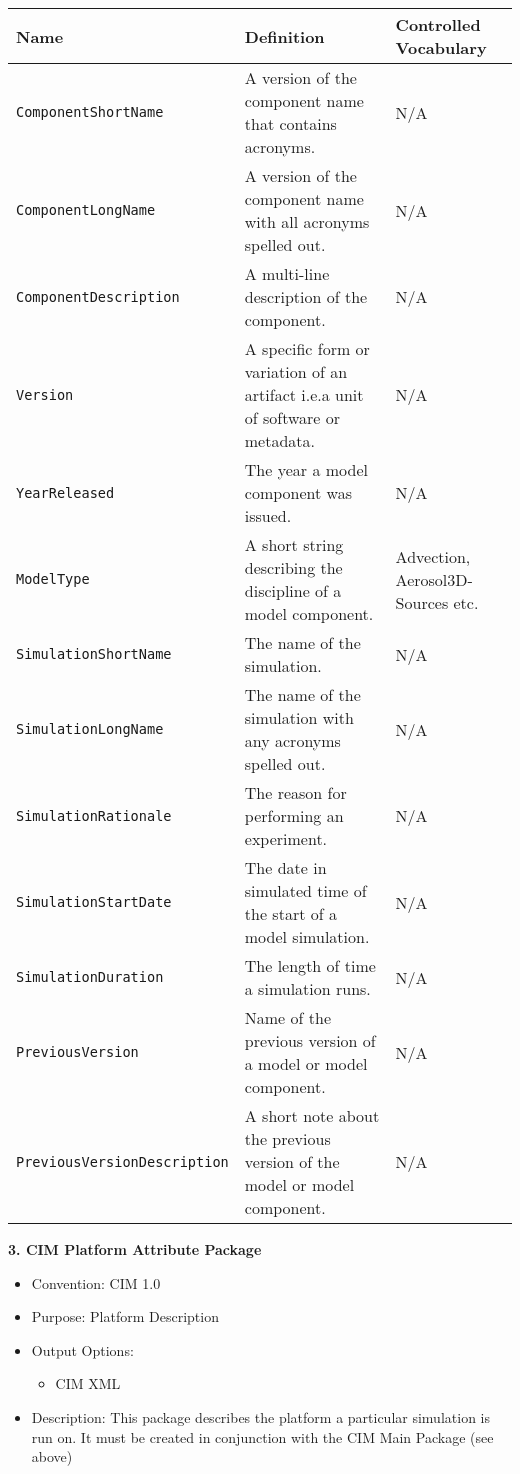 \begin{tabular}{|p{8cm}|p{20cm}|p{10cm}}
     {\bf Name} & {\bf Definition} & {\bf Controlled Vocabulary}\\
     \hline\hline
     {\tt ComponentShortName} & A version of the component name that contains acronyms. & N/A \\
     {\tt ComponentLongName} & A version of the component name with all acronyms spelled out. & N/A\\
     {\tt ComponentDescription} & A multi-line description of the component. & N/A \\
     {\tt Version} &  A specific form or variation of an artifact i.e.a unit of software or metadata. & N/A\\
     {\tt YearReleased} & The year a model component was issued. & N/A \\
     {\tt ModelType} & A short string describing the discipline of a model component. & Advection, Aerosol3D-Sources etc.\\
     {\tt SimulationShortName} & The name of the simulation. & N/A \\
     {\tt SimulationLongName} & The name of the simulation with any acronyms spelled out. & N/A \\ 
     {\tt SimulationRationale} & The reason for performing an experiment. & N/A\\
     {\tt SimulationStartDate} & The date in simulated time of the start of a model simulation. & N/A\\ 
     {\tt SimulationDuration} & The length of time a simulation runs.&  N/A\\ 
     {\tt PreviousVersion} & Name of the previous version of a model or model component. & N/A\\ 
     {\tt PreviousVersionDescription} &  A short note about the previous version of the model or model component. & N/A \\ 
\end{tabular}




\vspace{.20in}


{\bf 3. CIM Platform Attribute Package}

\begin{itemize}
    \item Convention: CIM 1.0
    \item Purpose: Platform Description
    \item Output Options:
    \begin{itemize}
       \item CIM XML 
    \end{itemize} 
    \item Description: This package describes the platform a particular simulation is run on. It must be created in conjunction with the CIM Main Package (see above) 
\end{itemize}


